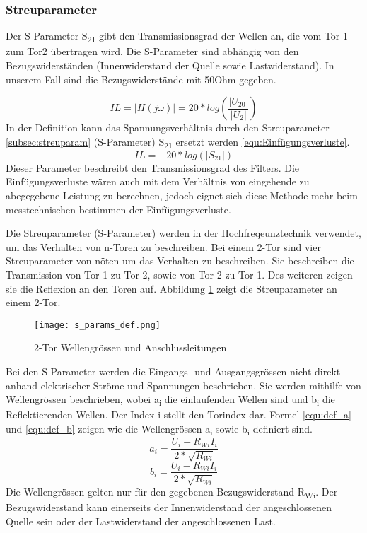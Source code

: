 \subsubsection{Streuparameter}\label{subsubsec:streuparameter}





Der S-Parameter S\textsubscript{21} gibt den Transmissionsgrad der Wellen an, die vom Tor 1 zum Tor2 übertragen wird. Die S-Parameter sind abhängig von den Bezugswiderständen (Innenwiderstand der Quelle sowie Lastwiderstand). In unserem Fall sind die Bezugswiderstände mit 50Ohm gegeben.

\begin{equation}\label{equ:Freqgang}
	IL = \left\lvert H(j\omega) \right\rvert = 20*log(\frac{ \left\lvert U_{20} \right\rvert }{ \left\lvert U_2 \right\rvert })
\end{equation}
In der Definition kann das Spannungsverhältnis durch den Streuparameter \ref{subsec:streuparam} (S-Parameter) S\textsubscript{21} ersetzt werden \ref{equ:Einfügungsverluste}.
\begin{equation}\label{equ:Einfügungsverluste}
	IL = -20*log (\left\lvert S_{21} \right\rvert)
\end{equation}
 Dieser Parameter beschreibt den Transmissionsgrad des Filters. Die Einfügungsverluste wären auch mit dem Verhältnis von eingehende zu abegegebene Leistung zu berechnen, jedoch eignet sich diese Methode mehr beim messtechnischen bestimmen der Einfügungsverluste. 
 
 Die Streuparameter (S-Parameter) werden in der Hochfreqeunztechnik verwendet, um das Verhalten von n-Toren zu beschreiben. Bei einem 2-Tor sind vier Streuparameter von nöten um das Verhalten zu beschreiben. Sie beschreiben die Transmission von Tor 1 zu Tor 2, sowie von Tor 2 zu Tor 1. Des weiteren zeigen sie die Reflexion an den Toren auf. Abbildung \ref{fig:2-Tor}  zeigt die Streuparameter an einem 2-Tor. 
\begin{figure}[H]
	\centering
	\texttt{[image: s\_params\_def.png]}
	\caption{2-Tor Wellengrössen und Anschlussleitungen \cite{hftech}}
	\label{fig:2-Tor}
\end{figure}
Bei den S-Parameter werden die Eingangs- und Ausgangsgrössen nicht direkt anhand elektrischer Ströme und Spannungen beschrieben. Sie werden mithilfe von Wellengrössen beschrieben, wobei a\textsubscript{i} die einlaufenden Wellen sind und b\textsubscript{i} die Reflektierenden Wellen. Der Index i stellt den Torindex dar. Formel \ref{equ:def_a} und \ref{equ:def_b} zeigen wie die Wellengrössen a\textsubscript{i} sowie b\textsubscript{i} definiert sind.
\begin{equation}\label{equ:def_a}
	a_{ i } = \frac{ U_{ i}+R_{ Wi }I_{ i }}{2*\sqrt{ R_{ Wi } }}
\end{equation}
\begin{equation}\label{equ:def_b}
	b_{ i } = \frac{ U_{ i}-R_{ Wi }I_{ i }}{2*\sqrt{ R_{ Wi } }}
\end{equation}
Die Wellengrössen gelten nur für den gegebenen Bezugswiderstand R\textsubscript{Wi}. Der Bezugswiderstand kann einerseits der Innenwiderstand der angeschlossenen Quelle sein oder der Lastwiderstand der angeschlossenen Last.

